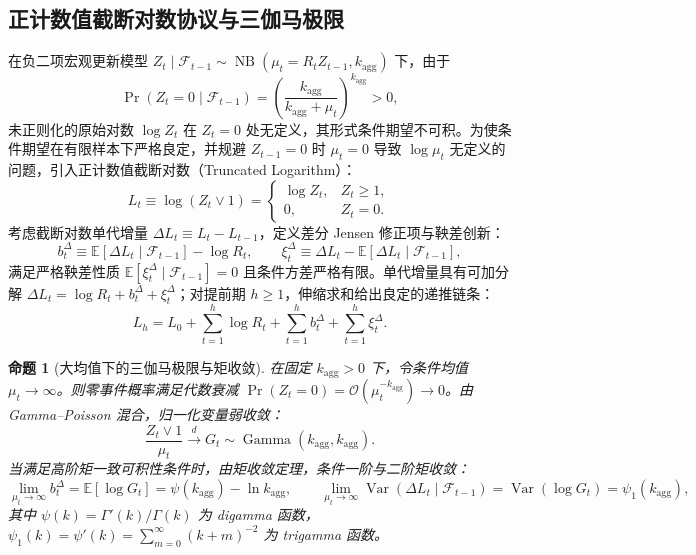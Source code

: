 \documentclass[11pt,a4paper]{article}
\newtheorem{proposition}[theorem]{命题}
\theoremstyle{remark}
\newcommand{\E}{\mathbb{E}}
\newcommand{\Var}{\operatorname{Var}}
\begin{document}
\subsection{正计数值截断对数协议与三伽马极限}
在负二项宏观更新模型 $Z_t \mid \mathcal{F}_{t-1} \sim \operatorname{NB}(\mu_t = R_t Z_{t-1}, k_{\text{agg}})$ 下，由于
\begin{equation}
\Pr(Z_t = 0 \mid \mathcal{F}_{t-1}) = \left(\frac{k_{\text{agg}}}{k_{\text{agg}} + \mu_t}\right)^{k_{\text{agg}}} > 0,
\end{equation}
未正则化的原始对数 $\log Z_t$ 在 $Z_t = 0$ 处无定义，其形式条件期望不可积。为使条件期望在有限样本下严格良定，并规避 $Z_{t-1}=0$ 时 $\mu_t = 0$ 导致 $\log\mu_t$ 无定义的问题，引入正计数值截断对数（Truncated Logarithm）：
\begin{equation}
L_t \equiv \log(Z_t \vee 1) = \begin{cases} \log Z_t, & Z_t \ge 1, \\ 0, & Z_t = 0. \end{cases}
\end{equation}
考虑截断对数单代增量 $\Delta L_t \equiv L_t - L_{t-1}$，定义差分 Jensen 修正项与鞅差创新：
\begin{equation}
b_t^\Delta \equiv \E[\Delta L_t \mid \mathcal{F}_{t-1}] - \log R_t, \qquad \xi_t^\Delta \equiv \Delta L_t - \E[\Delta L_t \mid \mathcal{F}_{t-1}],
\end{equation}
满足严格鞅差性质 $\E[\xi_t^\Delta \mid \mathcal{F}_{t-1}] = 0$ 且条件方差严格有限。单代增量具有可加分解 $\Delta L_t = \log R_t + b_t^\Delta + \xi_t^\Delta$；对提前期 $h \ge 1$，伸缩求和给出良定的递推链条：
\begin{equation}
L_h = L_0 + \sum_{t=1}^h \log R_t + \sum_{t=1}^h b_t^\Delta + \sum_{t=1}^h \xi_t^\Delta.
\end{equation}

\begin{proposition}[大均值下的三伽马极限与矩收敛]
在固定 $k_{\text{agg}} > 0$ 下，令条件均值 $\mu_t \to \infty$。则零事件概率满足代数衰减 $\Pr(Z_t = 0) = \mathcal{O}(\mu_t^{-k_{\text{agg}}}) \to 0$。由 Gamma--Poisson 混合，归一化变量弱收敛：
\begin{equation}
\frac{Z_t \vee 1}{\mu_t} \xrightarrow{d} G_t \sim \operatorname{Gamma}(k_{\text{agg}}, k_{\text{agg}}).
\end{equation}
当满足高阶矩一致可积性条件时，由矩收敛定理，条件一阶与二阶矩收敛：
\begin{equation}
\lim_{\mu_t \to \infty} b_t^\Delta = \E[\log G_t] = \psi(k_{\text{agg}}) - \ln k_{\text{agg}}, \qquad \lim_{\mu_t \to \infty} \Var(\Delta L_t \mid \mathcal{F}_{t-1}) = \Var(\log G_t) = \psi_1(k_{\text{agg}}),
\end{equation}
其中 $\psi(k) = \Gamma'(k)/\Gamma(k)$ 为 digamma 函数，$\psi_1(k) = \psi'(k) = \sum_{m=0}^\infty (k+m)^{-2}$ 为 trigamma 函数。
\end{proposition}
\end{document}
